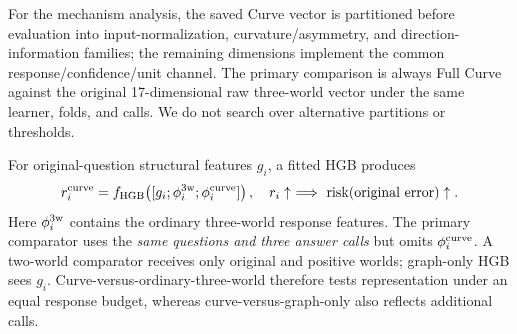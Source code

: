 \documentclass[11pt]{article}
\newcommand{\risk}{\operatorname{risk}}
\begin{document}
For the mechanism analysis, the saved Curve vector is partitioned before evaluation into input-normalization, curvature/asymmetry, and direction-information families; the remaining dimensions implement the common response/confidence/unit channel. The primary comparison is always Full Curve against the original 17-dimensional raw three-world vector under the same learner, folds, and calls. We do not search over alternative partitions or thresholds.

For original-question structural features $g_i$, a fitted HGB produces
\begin{equation}
r_i^{\rm curve}=f_{\rm HGB}\!\left([g_i;\phi_i^{\rm 3w};\phi_i^{\rm curve}]\right),
\quad r_i\uparrow\ \Longrightarrow\ \risk(\text{original error})\uparrow.
\label{eq:risk}
\end{equation}
Here $\phi_i^{\rm 3w}$ contains the ordinary three-world response features. The primary comparator uses the \emph{same questions and three answer calls} but omits $\phi_i^{\rm curve}$. A two-world comparator receives only original and positive worlds; graph-only HGB sees $g_i$. Curve-versus-ordinary-three-world therefore tests representation under an equal response budget, whereas curve-versus-graph-only also reflects additional calls.
\end{document}
